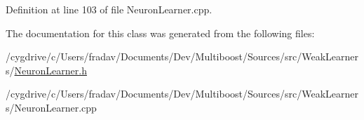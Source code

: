 Definition at line 103 of file NeuronLearner.cpp.



The documentation for this class was generated from the following files:\begin{DoxyCompactItemize}
\item 
/cygdrive/c/Users/fradav/Documents/Dev/Multiboost/Sources/src/WeakLearners/\hyperlink{NeuronLearner_8h}{NeuronLearner.h}\item 
/cygdrive/c/Users/fradav/Documents/Dev/Multiboost/Sources/src/WeakLearners/NeuronLearner.cpp\end{DoxyCompactItemize}
